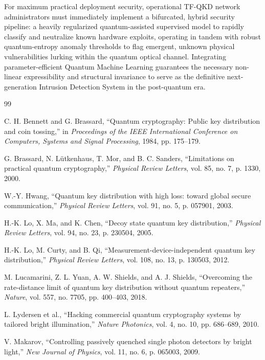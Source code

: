 \documentclass[10pt, journal, letterpaper, twocolumn]{IEEEtran}
\begin{document}
For maximum practical deployment security, operational TF-QKD network administrators must immediately implement a bifurcated, hybrid security pipeline: a heavily regularized quantum-assisted supervised model to rapidly classify and neutralize known hardware exploits, operating in tandem with robust quantum-entropy anomaly thresholds to flag emergent, unknown physical vulnerabilities lurking within the quantum optical channel. Integrating parameter-efficient Quantum Machine Learning guarantees the necessary non-linear expressibility and structural invariance to serve as the definitive next-generation Intrusion Detection System in the post-quantum era.
% 
% 
\begin{thebibliography}{99}

C. H. Bennett and G. Brassard, ``Quantum cryptography: Public key distribution and coin tossing,'' in \emph{Proceedings of the IEEE International Conference on Computers, Systems and Signal Processing}, 1984, pp. 175--179.

G. Brassard, N. Lütkenhaus, T. Mor, and B. C. Sanders, ``Limitations on practical quantum cryptography,'' \emph{Physical Review Letters}, vol. 85, no. 7, p. 1330, 2000.

W.-Y. Hwang, ``Quantum key distribution with high loss: toward global secure communication,'' \emph{Physical Review Letters}, vol. 91, no. 5, p. 057901, 2003.

H.-K. Lo, X. Ma, and K. Chen, ``Decoy state quantum key distribution,'' \emph{Physical Review Letters}, vol. 94, no. 23, p. 230504, 2005.

H.-K. Lo, M. Curty, and B. Qi, ``Measurement-device-independent quantum key distribution,'' \emph{Physical Review Letters}, vol. 108, no. 13, p. 130503, 2012.

M. Lucamarini, Z. L. Yuan, A. W. Shields, and A. J. Shields, ``Overcoming the rate-distance limit of quantum key distribution without quantum repeaters,'' \emph{Nature}, vol. 557, no. 7705, pp. 400--403, 2018.

L. Lydersen et al., ``Hacking commercial quantum cryptography systems by tailored bright illumination,'' \emph{Nature Photonics}, vol. 4, no. 10, pp. 686--689, 2010.

V. Makarov, ``Controlling passively quenched single photon detectors by bright light,'' \emph{New Journal of Physics}, vol. 11, no. 6, p. 065003, 2009.


\end{thebibliography}
\end{document}
